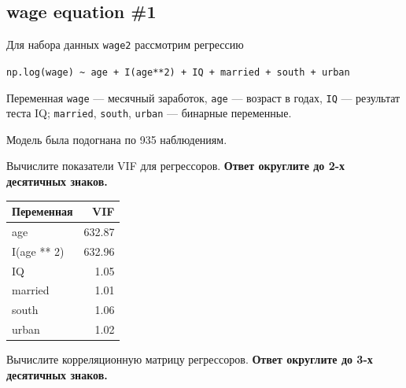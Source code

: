 \documentclass[
  russian,
]{article}
\newcounter{none} %
\begin{document}
\subsection{wage equation \#1}\label{wage-equation-1}

Для набора данных \texttt{wage2} рассмотрим регрессию

\texttt{np.log(wage)\ \textasciitilde{}\ age\ +\ I(age**2)\ +\ IQ\ +\ married\ +\ south\ +\ urban}

Переменная \texttt{wage} --- месячный заработок, \texttt{age} ---
возраст в годах, \texttt{IQ} --- результат теста IQ; \texttt{married},
\texttt{south}, \texttt{urban} --- бинарные переменные.

Модель была подогнана по 935 наблюдениям.

Вычислите показатели VIF для регрессоров. \textbf{Ответ округлите до 2-х
десятичных знаков.}

{\def\LTcaptype{none} %
\begin{longtable}[]{@{}lr@{}}
\toprule\noalign{}
Переменная & VIF \\
\midrule\noalign{}
\endhead
\bottomrule\noalign{}
\endlastfoot
age & 632.87 \\
I(age ** 2) & 632.96 \\
IQ & 1.05 \\
married & 1.01 \\
south & 1.06 \\
urban & 1.02 \\
\end{longtable}
}

Вычислите корреляционную матрицу регрессоров. \textbf{Ответ округлите до
3-х десятичных знаков.}
\end{document}
